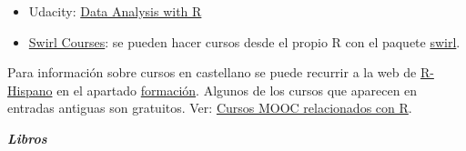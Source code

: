 \documentclass[]{book}
\providecommand{\tightlist}{%
  \setlength{\itemsep}{0pt}\setlength{\parskip}{0pt}}
\begin{document}
\begin{itemize}
\tightlist
\item
  Udacity: \href{https://eu.udacity.com/course/data-analysis-with-r--ud651}{Data Analysis with R}
\end{itemize}

\begin{itemize}
\tightlist
\item
  \href{https://swirlstats.com/scn/title.html}{Swirl Courses}:
  se pueden hacer cursos desde el propio R con el paquete
  \href{https://swirlstats.com}{swirl}.
\end{itemize}

Para información sobre cursos en castellano se puede recurrir a la web de \href{http://r-es.org/}{R-Hispano} en el apartado \href{http://r-es.org/category/formacion}{formación}. Algunos de los cursos que aparecen en entradas antiguas son gratuitos.
Ver: \href{http://r-es.org/2016/02/12/cursos-masivos-y-otra-formacion-on-line-sobre-r/}{Cursos MOOC relacionados con R}.

\textbf{\emph{Libros}}
\end{document}

